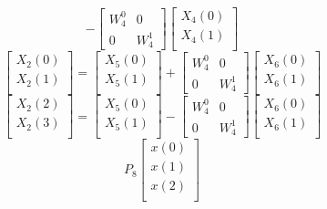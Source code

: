 \documentclass[journal,12pt,twocolumn]{IEEEtran}
\renewcommand\thesection{\arabic{section}}
\begin{document}
\begin{enumerate}[label=\arabic*.,ref=\thesection.\theenumi]
\begin{equation}
-
\begin{bmatrix}
W^{0}_{4} & 0\\
0 & W^{1}_{4}
\end{bmatrix}
\begin{bmatrix}
X_{4}(0) \\ 
X_{4}(1) \\ 
\end{bmatrix}
\end{equation}
\begin{equation}
\begin{bmatrix}
X_{2}(0) \\ 
X_{2}(1)\\ 
\end{bmatrix}
=
\begin{bmatrix}
X_{5}(0) \\ 
X_{5}(1)\\ 
\end{bmatrix}
+
\begin{bmatrix}
W^{0}_{4} & 0\\
0 & W^{1}_{4}
\end{bmatrix}
\begin{bmatrix}
X_{6}(0) \\ 
X_{6}(1) \\ 
\end{bmatrix}
\end{equation}
\begin{equation}
\begin{bmatrix}
X_{2}(2) \\ 
X_{2}(3)\\ 
\end{bmatrix}
=
\begin{bmatrix}
X_{5}(0) \\ 
X_{5}(1)\\ 
\end{bmatrix}
-
\begin{bmatrix}
W^{0}_{4} & 0\\
0 & W^{1}_{4}
\end{bmatrix}
\begin{bmatrix}
X_{6}(0) \\ 
X_{6}(1) \\ 
\end{bmatrix}
\end{equation}
\begin{equation}
P_{8}
\begin{bmatrix}
x(0) \\ 
x(1) \\ 
x(2) \\ 

\end{bmatrix}
\end{equation}
\end{enumerate}
\end{document}
